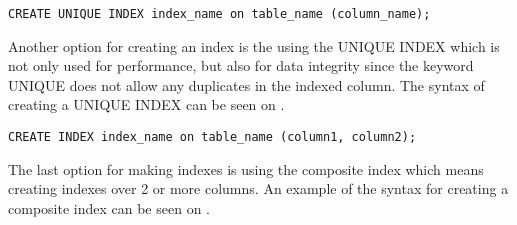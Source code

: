 \begin{lstlisting}[style=SQLstyle, numbers=none, xleftmargin=0\textwidth, numberblanklines=false, label=lst:example_of_using_unique_indexes, caption={Example of creating a UNIQUE INDEX}]
CREATE UNIQUE INDEX index_name on table_name (column_name);
\end{lstlisting}

\noindent
Another option for creating an index is the using the UNIQUE INDEX which is not only used for performance, but also for data integrity since the keyword UNIQUE does not allow any duplicates in the indexed column. The syntax of creating a UNIQUE INDEX can be seen on .

\begin{lstlisting}[style=SQLstyle, numberblanklines=false, xleftmargin=0\textwidth, label=lst:example_of_using_composite_indexes, numbers=none, caption={Example of creating a composite index}]
CREATE INDEX index_name on table_name (column1, column2);
\end{lstlisting}

\noindent
The last option for making indexes is using the composite index which means creating indexes over 2 or more columns. An example of the syntax for creating a composite index can be seen on .

